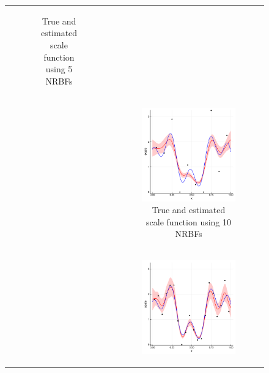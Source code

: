 \documentclass{article}
\numberwithin{equation}{section}
\begin{document}
\begin{figure}[t!]
\begin{tabular}{cc}
\begin{subfigure}[t]{0.3\textwidth}
      \caption{True and estimated scale function using 5 NRBFs}
    \end{subfigure}
    \\[4ex]
    &
    \begin{subfigure}[t]{0.3\textwidth}
      \includegraphics[width=\textwidth]{figures/scale/est-p1000-a10-se1.pdf}
      \caption{True and estimated scale function using 10 NRBFs}
    \end{subfigure}
    \\[4ex]
    &
    \begin{subfigure}[t]{0.3\textwidth}
      \includegraphics[width=\textwidth]{figures/scale/est-p1000-a20-se1.pdf}

\end{subfigure}
\end{tabular}
\end{figure}
\end{document}
